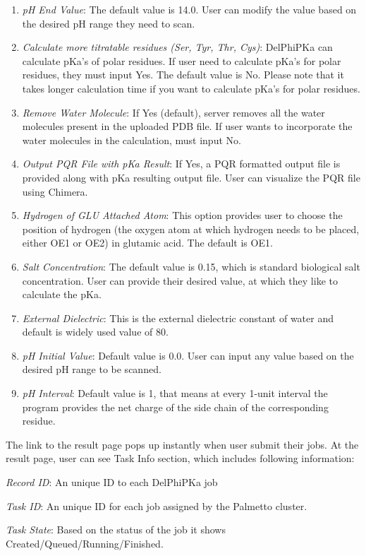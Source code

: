 \documentclass[9pt,tutorial,pubversion]{livecoms}
\begin{document}
\begin{enumerate}
    \item \textit{ pH End Value}: The default value is 14.0. User can modify the value based on the desired pH range they need to scan.
    \item \textit{ Calculate more titratable residues (Ser, Tyr, Thr, Cys)}: DelPhiPKa can calculate pKa’s of polar residues. If user need to calculate pKa’s for polar residues, they must input Yes. The default value is No. Please note that it takes longer calculation time if you want to calculate pKa’s for polar residues.  
    \item \textit{ Remove Water Molecule}: If Yes (default), server removes all the water molecules present in the uploaded PDB file. If user wants to incorporate the water molecules in the calculation, must input No.
    \item \textit{ Output PQR File with pKa Result}: If Yes, a PQR formatted output file is provided along with pKa resulting output file. User can visualize the PQR file using Chimera.
    \item \textit{ Hydrogen of GLU Attached Atom}: This option provides user to choose the position of hydrogen (the oxygen atom at which hydrogen needs to be placed, either OE1 or OE2) in glutamic acid. The default is OE1.
    \item \textit{ Salt Concentration}: The default value is 0.15, which is standard biological salt concentration. User can provide their desired value, at which they like to calculate the pKa.
    \item \textit{ External Dielectric}: This is the external dielectric constant of water and default is widely used value of 80.
    \item \textit{ pH Initial Value}: Default value is 0.0. User can input any value based on the desired pH range to be scanned.
    \item \textit{ pH Interval}: Default value is 1, that means at every 1-unit interval the program provides the net charge of the side chain of the corresponding residue. 
\end{enumerate}
The link to the result page pops up instantly when user submit their jobs. At the result page, user can see Task Info section, which includes following information:

\textit{Record ID}: An unique ID to each DelPhiPKa job

\textit{Task ID}: An unique ID for each job assigned by the Palmetto cluster.

\textit{Task State}: Based on the status of the job it shows Created/Queued/Running/Finished.
\end{document}

